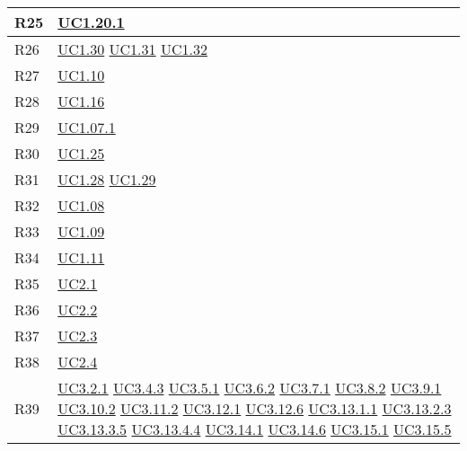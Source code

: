 \begin{longtable}{|P{6cm}|P{6cm}|}
	\hline R25 & \hyperref[UC1.20.1]{UC1.20.1} \\	
	\hline R26 & \hyperref[UC1.30]{UC1.30} \linebreak \hyperref[UC1.31]{UC1.31} \linebreak \hyperref[UC1.32]{UC1.32} \\
	\hline R27 & \hyperref[UC1.10]{UC1.10} \\
	\hline R28 & \hyperref[UC1.16]{UC1.16} \\
	\hline R29 & \hyperref[UC1.07.1]{UC1.07.1} \\
	\hline R30 & \hyperref[UC1.25]{UC1.25} \\
	\hline R31 & \hyperref[UC1.28]{UC1.28} \linebreak \hyperref[UC1.29]{UC1.29}  \\	 
	\hline R32 & \hyperref[UC1.08]{UC1.08} \\
	\hline R33 & \hyperref[UC1.09]{UC1.09} \\
	\hline R34 & \hyperref[UC1.11]{UC1.11} \\	
	\hline R35 & \hyperref[UC2.1]{UC2.1} \\
	\hline R36 & \hyperref[UC2.2]{UC2.2} \\
	\hline R37 & \hyperref[UC2.3]{UC2.3} \\
	\hline R38 & \hyperref[UC2.4]{UC2.4} \\	
	\hline R39 & \hyperref[UC3.2.1]{UC3.2.1} \linebreak \hyperref[UC3.4.3]{UC3.4.3} \linebreak \hyperref[UC3.5.1]{UC3.5.1} \linebreak \hyperref[UC3.6.2]{UC3.6.2} \linebreak \hyperref[UC3.7.1]{UC3.7.1} \linebreak \hyperref[UC3.8.2]{UC3.8.2} \linebreak \hyperref[UC3.9.1]{UC3.9.1} \linebreak \hyperref[UC3.10.2]{UC3.10.2} \linebreak \hyperref[UC3.11.2]{UC3.11.2} \linebreak  \hyperref[UC3.12.1]{UC3.12.1} \linebreak \hyperref[UC3.12.6]{UC3.12.6} \linebreak  \hyperref[UC3.13.1.1]{UC3.13.1.1} \linebreak \hyperref[UC3.13.2.3]{UC3.13.2.3} \linebreak \hyperref[UC3.13.3.5]{UC3.13.3.5} \linebreak \hyperref[UC3.13.4.4]{UC3.13.4.4} \linebreak \hyperref[UC3.14.1]{UC3.14.1} \linebreak \hyperref[UC3.14.6]{UC3.14.6} \linebreak \hyperref[UC3.15.1]{UC3.15.1} \linebreak \hyperref[UC3.15.5]{UC3.15.5} \\

\end{longtable}
